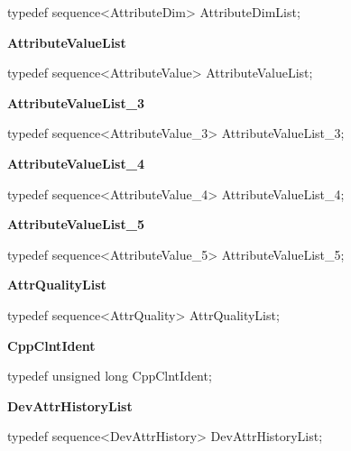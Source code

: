 typedef sequence<AttributeDim> AttributeDimList;\\


\begin{flushleft}
\textbf{AttributeValueList}
\par\end{flushleft}

typedef sequence<AttributeValue> AttributeValueList;\\


\begin{flushleft}
\textbf{AttributeValueList\_3}
\par\end{flushleft}

typedef sequence<AttributeValue\_3> AttributeValueList\_3;\\


\begin{flushleft}
\textbf{AttributeValueList\_4}
\par\end{flushleft}

typedef sequence<AttributeValue\_4> AttributeValueList\_4;\\


\begin{flushleft}
\textbf{AttributeValueList\_5}
\par\end{flushleft}

typedef sequence<AttributeValue\_5> AttributeValueList\_5;\\


\begin{flushleft}
\textbf{AttrQualityList}
\par\end{flushleft}

typedef sequence<AttrQuality> AttrQualityList;\\


\begin{flushleft}
\textbf{CppClntIdent}
\par\end{flushleft}

typedef unsigned long CppClntIdent;\\


\begin{flushleft}
\textbf{DevAttrHistoryList}
\par\end{flushleft}

typedef sequence<DevAttrHistory> DevAttrHistoryList;\\


